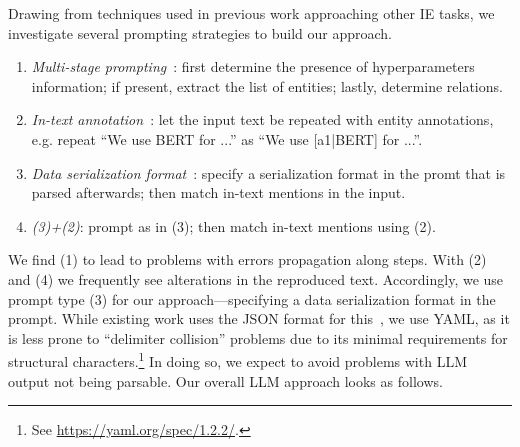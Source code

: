 Drawing from techniques used in previous work approaching other IE tasks, we investigate several prompting strategies to build our approach.
%
%

\begin{enumerate}
    \item \textit{Multi-stage prompting}~\cite{Polak2023}: first determine the presence of hyperparameters information; if present, extract the list of entities; lastly, determine relations.
    \item \textit{In-text annotation}~\cite{Wang2023}: let the input text be repeated with entity annotations, e.g. repeat ``We use BERT for ...'' as ``We use [a1|BERT] for ...''. %
    \item \textit{Data serialization format}~\cite{Dunn2022}: specify a serialization format in the promt that is parsed afterwards; then match in-text mentions in the input.
    \item \textit{(3)+(2)}: prompt as in (3); then match in-text mentions using (2).
\end{enumerate}

We find (1) to lead to problems with errors propagation along steps. With (2) and (4) we frequently see alterations in the reproduced text. Accordingly, we use prompt type (3) for our approach---specifying a data serialization format in the prompt.
While existing work uses the JSON format for this~\cite{Dunn2022}, we use YAML, as it is less prone to ``delimiter collision'' problems due to its minimal requirements for structural characters.\footnote{See \url{https://yaml.org/spec/1.2.2/}.} 
In doing so, we expect to avoid problems with LLM output not being parsable. Our overall LLM approach looks as follows.
%
%

